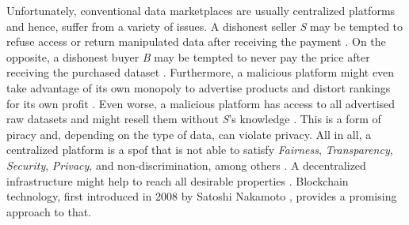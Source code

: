Unfortunately, conventional data marketplaces are usually centralized platforms and hence, suffer from a variety of issues. A dishonest seller \emph{S} may be tempted to refuse access or return manipulated data after receiving the payment \cite{suBDTFBlockchainBasedData2020,lawrenzBlockchainTechnologyApproach2019}. On the opposite, a dishonest buyer \emph{B} may be tempted to never pay the price after receiving the purchased dataset \cite{lawrenzBlockchainTechnologyApproach2019}. Furthermore, a malicious platform might even take advantage of its own monopoly to advertise products and distort rankings for its own profit \cite{ramachandranDecentralizedDataMarketplace2018}. Even worse, a malicious platform has access to all advertised raw datasets \cite{banerjeeBlockchainEnabledData2019} and might resell them without \emph{S}'s knowledge \cite{serranoPeertoPeerOwnershipPreservingData2021,suBDTFBlockchainBasedData2020,daiSDTESecureBlockchainBased2020}. This is a form of piracy and, depending on the type of data, can violate privacy. All in all, a centralized platform is a \acrfull{spof} \cite{daiSDTESecureBlockchainBased2020} that is not able to satisfy \emph{Fairness}, \emph{Transparency}, \emph{Security}, \emph{Privacy}, and non-discrimination, among others \cite{banerjeeBlockchainEnabledData2019}. A decentralized infrastructure might help to reach all desirable properties \cite{ramachandranDecentralizedDataMarketplace2018}. Blockchain technology, first introduced in 2008 by Satoshi Nakamoto \cite{nakamotoBitcoinPeertoPeerElectronic}, provides a promising approach to that.



